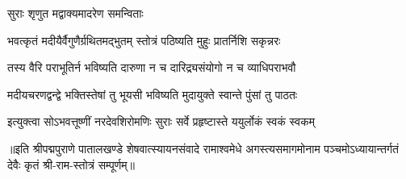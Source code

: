 
\onelineshloka
{सुराः शृणुत मद्वाक्यमादरेण समन्विताः} %

\twolineshloka
{भवत्कृतं मदीयैर्वैगुणैर्ग्रथितमद्भुतम्}
{स्तोत्रं पठिष्यति मुहुः प्रातर्निशि सकृन्नरः} %

\twolineshloka
{तस्य वैरि पराभूतिर्न भविष्यति दारुणा}
{न च दारिद्र्यसंयोगो न च व्याधिपराभवौ} %

\twolineshloka
{मदीयचरणद्वन्द्वे भक्तिस्तेषां तु भूयसी}
{भविष्यति मुदायुक्ते स्वान्ते पुंसां तु पाठतः} %

\twolineshloka
{इत्युक्त्वा सोऽभवत्तूष्णीं नरदेवशिरोमणिः}
{सुराः सर्वे प्रहृष्टास्ते ययुर्लोकं स्वकं स्वकम्} %

॥इति श्रीपद्मपुराणे पातालखण्डे शेषवात्स्यायनसंवादे रामाश्वमेधे अगस्त्यसमागमोनाम पञ्चमोऽध्यायान्तर्गतं देवैः कृतं श्री-राम-स्तोत्रं सम्पूर्णम्॥
